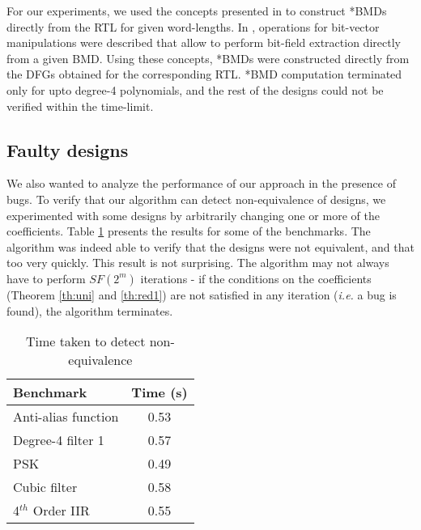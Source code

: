For our experiments, we used the concepts presented in
\cite{arditi:bmd} to construct *BMDs directly from the RTL for
given word-lengths. In \cite{arditi:bmd}, operations for bit-vector
manipulations were described that allow  to perform bit-field
extraction directly from a given BMD. Using these concepts, *BMDs 
were constructed directly from the DFGs obtained for the corresponding
RTL. *BMD computation terminated only for upto degree-4 polynomials,
and the rest of the designs could not be verified within the
time-limit. 


\subsection{Faulty designs}
We also wanted to analyze the performance of our approach in the
presence of bugs. To verify that our algorithm can detect
non-equivalence of designs, we experimented with some designs 
by arbitrarily changing one or more of the coefficients. Table
\ref{tab:bug} presents the results for some of the benchmarks. The
algorithm was indeed able to verify that the designs were not
equivalent, and that too very quickly. This result is not surprising. 
The algorithm may not always have to perform $SF(2^m)$ iterations - if
the conditions on the coefficients (Theorem \ref{th:uni} and
\ref{th:red1}) are not satisfied in any iteration
({\it i.e.} a bug is found), the algorithm terminates. 



\begin{table}[htb]
\begin{center}
\begin{small}
\caption{Time taken to detect non-equivalence}
\label{tab:bug}
\begin{tabular}{||l|c||} \hline
{\bf Benchmark}     & {\bf Time (s)} \\ \hline \hline
Anti-alias function & 0.53           \\ \hline
Degree-4 filter 1   & 0.57           \\ \hline
PSK                 & 0.49           \\ \hline
Cubic filter        & 0.58           \\ \hline
4$^{th}$ Order IIR  & 0.55           \\ \hline
\end{tabular}
\end{small}
\end{center}
\end{table}


